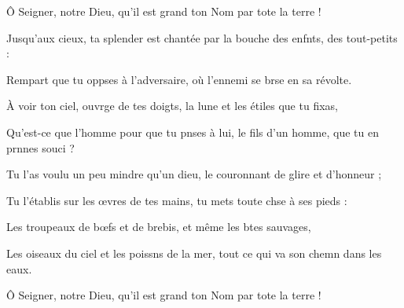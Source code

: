 \item Ô Seigner, notre Dieu,\psstar{} qu’il est grand ton Nom par tote la terre !
\item Jusqu’aux cieux, ta splender est chantée\psstar{} par la bouche des enfnts, des tout-petits :
\item Rempart que tu oppses à l’adversaire,\psstar{} où l’ennemi se brse en sa révolte.
\item À voir ton ciel, ouvrge de tes doigts,\psstar{} la lune et les étiles que tu fixas,
\item Qu’est-ce que l’homme pour que tu pnses à lui,\psstar{} le fils d’un homme, que tu en prnnes souci ?
\item Tu l’as voulu un peu mindre qu’un dieu,\psstar{} le couronnant de glire et d’honneur ;
\item Tu l’établis sur les œvres de tes mains,\psstar{} tu mets toute chse à ses pieds :
\item Les troupeaux de bœfs et de brebis,\psstar{} et même les btes sauvages,
\item Les oiseaux du ciel et les poissns de la mer,\psstar{} tout ce qui va son chemn dans les eaux.
\item Ô Seigner, notre Dieu,\psstar{} qu’il est grand ton Nom par tote la terre !